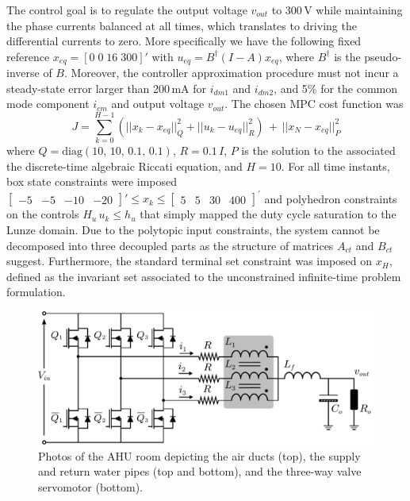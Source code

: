 The control goal is to regulate the output voltage $v_{out}$ to 300$\,$V while maintaining the phase currents balanced at all times, which translates to driving the differential currents to zero. More specifically we have the following  fixed reference $x_{eq} = [0 \; 0 \; 16 \; 300]'$ with $u_{eq} = B^{\dagger}(I-A)x_{eq}$, where $B^\dagger$ is the pseudo-inverse of $B$. Moreover, the controller approximation procedure must not incur a steady-state error larger than 200$\,$mA for $i_{dm1}$ and $i_{dm2}$, and 5\% for the common mode component $i_{cm}$ and output voltage $v_{out}$. The chosen MPC cost function was
\begin{equation}
	J = \sum_{k=0}^{H-1} (||x_{k}-x_{eq}||_Q^2 + ||u_{k}-u_{eq}||_R^2) \, + \, ||x_{N}-x_{eq}||_P^2
\end{equation}
where $Q = \text{diag}(10, \, 10, \, 0.1, \, 0.1)$, $R = 0.1 \, I$, $P$ is the solution to the associated the discrete-time algebraic Riccati equation, and $H=10$. For all time instants, box state constraints were imposed $\begin{bmatrix}-5 & -5 & -10 & -20\end{bmatrix}' \leq x_{k} \leq \begin{bmatrix}5 & 5 & 30 & 400\end{bmatrix}^{\prime}$ and polyhedron constraints on the controls $H_u \, u_k \leq h_u$ that simply mapped the duty cycle saturation to the Lunze domain. Due to the polytopic input constraints, the system cannot be decomposed into three decoupled parts as the structure of matrices $A_{ct}$ and $B_{ct}$ suggest. Furthermore, the standard terminal set constraint was imposed on $x_H$, defined as the invariant set associated to the unconstrained infinite-time problem formulation.


\begin{figure}[!t]
	\centering
	\includegraphics[width=0.7\linewidth]{../images/chap4_simres_multicelldcdc}
	\caption{Photos of the AHU room depicting the air ducts (top), the supply and return water pipes (top and bottom), and the three-way valve servomotor (bottom).}
	\label{fig.asd}
\end{figure}


